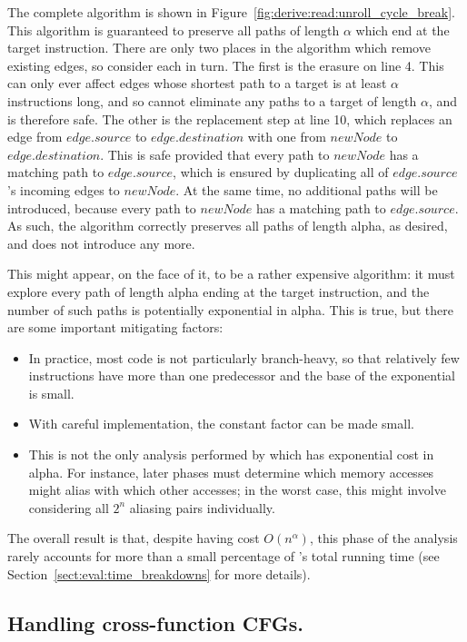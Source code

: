 The complete algorithm is shown in
Figure~\ref{fig:derive:read:unroll_cycle_break}.  This algorithm is
guaranteed to preserve all paths of length $\alpha$ which end at the
target instruction.  There are only two places in the algorithm which
remove existing edges, so consider each in turn.  The first is the
erasure on line 4.  This can only ever affect edges whose shortest
path to a target is at least $\alpha$ instructions long, and so cannot
eliminate any paths to a target of length $\alpha$, and is therefore
safe.  The other is the replacement step at line 10, which replaces an
edge from $edge.source$ to $edge.destination$ with one from $newNode$
to $edge.destination$.  This is safe provided that every path to
$newNode$ has a matching path to $edge.source$, which is ensured by
duplicating all of $edge.source$'s incoming edges to $newNode$.  At
the same time, no additional paths will be introduced, because every
path to $newNode$ has a matching path to $edge.source$.  As such, the
algorithm correctly preserves all paths of length \gls{alpha},
as desired, and does not introduce any more.

This might appear, on the face of it, to be a rather expensive
algorithm: it must explore every path of length \gls{alpha}
ending at the target instruction, and the number of such paths is
potentially exponential in \gls{alpha}.  This is true, but
there are some important mitigating factors:

\begin{itemize}
\item In practice, most code is not particularly branch-heavy, so that
  relatively few instructions have more than one predecessor and the
  base of the exponential is small.
\item With careful implementation, the constant factor can be made
  small.
\item This is not the only analysis performed by {\technique} which
  has exponential cost in \gls{alpha}.  For instance, later
  phases must determine which memory accesses might alias with which
  other accesses; in the worst case, this might involve considering
  all $2^n$ aliasing pairs individually.
\end{itemize}

The overall result is that, despite having cost $O(n^{\alpha})$, this
phase of the analysis rarely accounts for more than a small percentage
of {\implementation}'s total running time (see
Section~\ref{sect:eval:time_breakdowns} for more details).
  
\subsection{Handling cross-function CFGs.}

